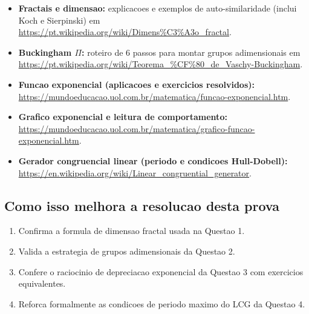 \documentclass[12pt,a4paper]{article}
\begin{document}
\begin{itemize}
  \item \textbf{Fractais e dimensao:} explicacoes e exemplos de auto-similaridade (inclui Koch e Sierpinski) em
  \url{https://pt.wikipedia.org/wiki/Dimens%C3%A3o_fractal}.

  \item \textbf{Buckingham $\Pi$:} roteiro de 6 passos para montar grupos adimensionais em
  \url{https://pt.wikipedia.org/wiki/Teorema_%CF%80_de_Vaschy-Buckingham}.

  \item \textbf{Funcao exponencial (aplicacoes e exercicios resolvidos):}
  \url{https://mundoeducacao.uol.com.br/matematica/funcao-exponencial.htm}.

  \item \textbf{Grafico exponencial e leitura de comportamento:}
  \url{https://mundoeducacao.uol.com.br/matematica/grafico-funcao-exponencial.htm}.

  \item \textbf{Gerador congruencial linear (periodo e condicoes Hull-Dobell):}
  \url{https://en.wikipedia.org/wiki/Linear_congruential_generator}.
\end{itemize}

\subsection*{Como isso melhora a resolucao desta prova}
\begin{enumerate}
  \item Confirma a formula de dimensao fractal usada na Questao 1.
  \item Valida a estrategia de grupos adimensionais da Questao 2.
  \item Confere o raciocinio de depreciacao exponencial da Questao 3 com exercicios equivalentes.
  \item Reforca formalmente as condicoes de periodo maximo do LCG da Questao 4.
\end{enumerate}
\end{document}
